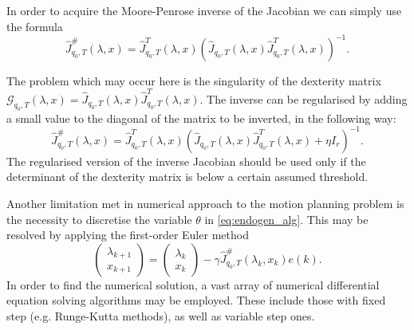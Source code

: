 In order to acquire the Moore-Penrose inverse of the Jacobian we can simply use the formula
\begin{equation}
\hat J^\#_{q_0, T}(\lambda, x)=\hat J^T_{q_0, T}(\lambda, x)\left(\hat J_{q_0, T}(\lambda, x)\hat J^T_{q_0, T}(\lambda, x)\right)^{-1}.
\end{equation}

The problem which may occur here is the singularity of the dexterity matrix\\
$\mathcal{G}_{q_0,T}(\lambda,x)=\hat J_{q_0, T}(\lambda, x)\hat J^T_{q_0, T}(\lambda, x)$. The inverse can be regularised by adding a small value to the diagonal of the matrix to be inverted, in the following way:
\begin{equation}
\hat J^\#_{q_0, T}(\lambda, x)=\hat J^T_{q_0, T}(\lambda, x)\left(\hat J_{q_0, T}(\lambda, x)\hat J^T_{q_0, T}(\lambda, x)+\eta I_r\right)^{-1}.
\end{equation}
The regularised version of the inverse Jacobian should be used only if the determinant of the dexterity matrix is below a certain assumed threshold.

Another limitation met in numerical approach to the motion planning problem is the necessity to discretise the variable $\theta$ in \eqref{eq:endogen_alg}.
This may be resolved by applying the first-order Euler method
\begin{equation}
\begin{pmatrix}
\lambda_{k+1}\\
x_{k+1}
\end{pmatrix}  =\begin{pmatrix}\lambda_{k}\\
x_{k}
\end{pmatrix} - \gamma \hat J^\#_{q_0, T}(\lambda_k, x_k)e(k).
\end{equation}
In order to find the numerical solution, a vast array of numerical differential equation solving algorithms may be employed. These include those with fixed step (e.g. Runge-Kutta methods), as well as variable step ones.